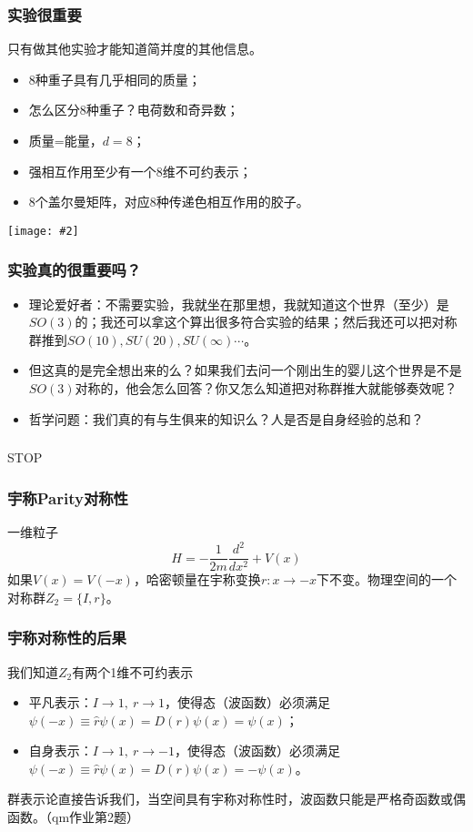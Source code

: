 \documentclass[CJK]{beamer}
\newcommand{\cpic}[2]{
\begin{center}
\texttt{[image: \#2]}
\end{center}
}
\begin{document}
\begin{frame}
\frametitle{\bch 实验很重要 \ech}
\bch
只有做其他实验才能知道简并度的其他信息。
\begin{itemize}
\item 8种重子具有几乎相同的质量；
\item 怎么区分8种重子？电荷数和奇异数；
\item 质量=能量，$d=8$；
\item 强相互作用至少有一个8维不可约表示；
\item 8个盖尔曼矩阵，对应8种传递色相互作用的胶子。
\end{itemize}
\cpic{0.2}{gmm}
\ech
\end{frame}


\begin{frame}
\frametitle{\bch 实验真的很重要吗？ \ech}
\bch
\begin{itemize}
\item
理论爱好者：不需要实验，我就坐在那里想，我就知道这个世界（至少）是$SO(3)$的；我还可以拿这个算出很多符合实验的结果；然后我还可以把对称群推到$SO(10),SU(20),SU(\infty) \cdots$。
\item
但这真的是完全想出来的么？如果我们去问一个刚出生的婴儿这个世界是不是$SO(3)$对称的，他会怎么回答？你又怎么知道把对称群推大就能够奏效呢？
\item
哲学问题：我们真的有与生俱来的知识么？人是否是自身经验的总和？
\end{itemize}
\ech
\end{frame}

\begin{frame}
\frametitle{\bch  \ech}
\bch
STOP
\ech
\end{frame}


\begin{frame}
\frametitle{\bch 宇称Parity对称性\ech}
\bch
一维粒子
$$
H = -\frac{1}{2m} \frac{d^2}{dx^2} + V(x)
$$
如果$V(x) = V(-x)$，哈密顿量在宇称变换$r : x \to -x$下不变。物理空间的一个对称群$Z_2 = \{I ,r\}$。
\ech
\end{frame}

\begin{frame}
\frametitle{\bch 宇称对称性的后果\ech}
\bch
我们知道$Z_2$有两个1维不可约表示
\begin{itemize}
\item 平凡表示：$I \to 1,\ r \to 1$，使得态（波函数）必须满足$\psi(-x) \equiv \hat r \psi(x) = D(r) \psi(x) = \psi(x)$；
\item 自身表示：$I \to 1,\ r \to -1$，使得态（波函数）必须满足$\psi(-x) \equiv \hat r \psi(x) = D(r) \psi(x) = -\psi(x)$。
\end{itemize}
群表示论直接告诉我们，当空间具有宇称对称性时，波函数只能是严格奇函数或偶函数。（qm作业第2题）

\ech
\end{frame}
\end{document}
